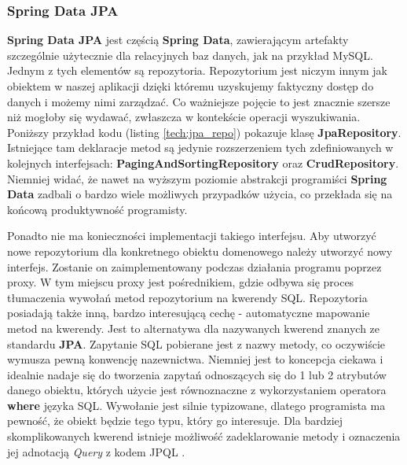 		\subsubsection{Spring Data JPA}
		\label{tech:spring_data_jpa}
		\textbf{Spring Data JPA} jest częścią \textbf{Spring Data}, zawierającym artefakty szczególnie użytecznie dla relacyjnych baz danych, jak na przykład MySQL. Jednym z tych elementów są repozytoria. Repozytorium jest niczym innym jak obiektem w naszej aplikacji dzięki któremu uzyskujemy faktyczny dostęp do danych i możemy nimi zarządzać. Co ważniejsze pojęcie to jest znacznie szersze niż mogłoby się wydawać, zwłaszcza w kontekście operacji wyszukiwania. Poniższy przykład kodu (listing \ref{tech:jpa_repo}) pokazuje klasę \textbf{JpaRepository}. Istniejące tam deklaracje metod są jedynie rozszerzeniem tych zdefiniowanych w kolejnych interfejsach: \textbf{PagingAndSortingRepository} oraz \textbf{CrudRepository}. Niemniej widać, że nawet na wyższym poziomie abstrakcji programiści \textbf{Spring Data} zadbali o bardzo wiele możliwych przypadków użycia, co przekłada się na końcową produktywność programisty. 
		Ponadto nie ma konieczności implementacji takiego interfejsu. Aby utworzyć nowe repozytorium dla konkretnego obiektu domenowego należy utworzyć nowy interfejs. Zostanie on zaimplementowany podczas działania programu poprzez proxy. W tym miejscu proxy jest pośrednikiem, gdzie odbywa się proces tłumaczenia wywołań metod repozytorium na kwerendy SQL. Repozytoria posiadają także inną, bardzo interesującą cechę - automatyczne mapowanie metod na kwerendy. Jest to alternatywa dla nazywanych kwerend znanych ze standardu \textbf{JPA}. Zapytanie SQL pobierane jest z nazwy metody, co oczywiście wymusza pewną konwencję nazewnictwa. Niemniej jest to koncepcja ciekawa i idealnie nadaje się do tworzenia zapytań odnoszących się do 1 lub 2 atrybutów danego obiektu, których użycie jest równoznaczne z wykorzystaniem operatora \textbf{where} języka SQL. Wywołanie jest silnie typizowane, dlatego programista ma pewność, że obiekt będzie tego typu, który go interesuje. Dla bardziej skomplikowanych kwerend istnieje możliwość zadeklarowanie metody i oznaczenia jej adnotacją \textit{\@{}Query} z kodem JPQL \cite{jpql} \cite{spring_data}.
			
